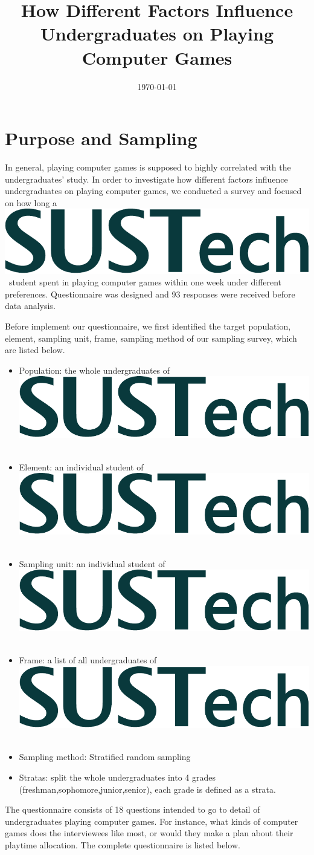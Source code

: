\documentclass[scheme=plain]{ctexart}
\title{How Different Factors Influence Undergraduates on Playing Computer Games}
\author{}
\date{\today}
\newcommand{\SUSTech}{\includegraphics[height=2ex]{logo}}
\begin{document}
\maketitle\tableofcontents\clearpage

\section{Purpose and Sampling}
In general, playing computer games is supposed to highly correlated with the undergraduates' study. In order to investigate how different factors influence undergraduates on playing computer games, we conducted a survey and focused on how long a \SUSTech\ student spent in playing computer games within one week under different preferences. Questionnaire was designed and 93 responses were received before data analysis.

Before implement our questionnaire, we first identified the target population, element, sampling unit, frame, sampling method of our sampling survey, which are listed below.
\begin{itemize}
    \item Population: the whole undergraduates of \SUSTech\
    \item Element: an individual student of \SUSTech\
    \item Sampling unit: an individual student of \SUSTech\
    \item Frame: a list of all undergraduates of \SUSTech\
    \item Sampling method: Stratified random sampling
    \item Stratas: split the whole undergraduates into 4 grades (freshman,sophomore,junior,senior), each grade is defined as a strata.
\end{itemize}

The questionnaire consists of 18 questions intended to go to detail of undergraduates playing computer games. For instance, what kinds of computer games does the interviewees like most, or would they make a plan about their playtime allocation. The complete questionnaire is listed below.
\end{document}
